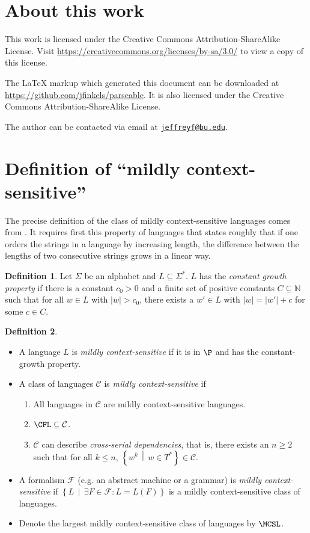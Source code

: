 \documentclass{article}
\theoremstyle{remark} \newtheorem{technicality}{Technical note}
\theoremstyle{definition} \newtheorem{definition}{Definition}
\newcommand{\email}[1]{\href{mailto:#1}{\nolinkurl{#1}}} %
\newcommand{\lb}{\left\{} %
\newcommand{\rb}{\right\}} %
\newcommand{\st}{\,\middle|\,} %
\begin{document}
\section{About this work}

This work is licensed under the Creative Commons Attribution-ShareAlike License.
Visit \mbox{\url{https://creativecommons.org/licenses/by-sa/3.0/}} to view a copy of this license.

The \LaTeX{} markup which generated this document can be downloaded at \mbox{\url{https://github.com/jfinkels/parseable}}.
It is also licensed under the Creative Commons Attribution-ShareAlike License.

The author can be contacted via email at \email{jeffreyf@bu.edu}.




\appendix
\section{Definition of ``mildly context-sensitive''}
\label{app:definitions}

The precise definition of the class of mildly context-sensitive languages comes from \cite{kallmeyer}.
It requires first this property of languages that states roughly that if one orders the strings in a language by increasing length, the difference between the lengths of two consecutive strings grows in a linear way.
\begin{definition}
  Let $\Sigma$ be an alphabet and $L\subseteq\Sigma^*$.
  $L$ has the \emph{constant growth property} if there is a constant $c_0>0$ and a finite set of positive constants $C\subseteq\mathbb{N}$ such that for all $w\in L$ with $|w|>c_0$, there exists a $w'\in L$ with $|w|=|w'|+c$ for some $c\in C$.
\end{definition}
\begin{definition}\mbox{}
  \begin{itemize}
  \item A language $L$ is \emph{mildly context-sensitive} if it is in $\P$ and has the constant-growth property.
  \item A class of languages $\mathcal{C}$ is \emph{mildly context-sensitive} if
    \begin{enumerate}
    \item All languages in $\mathcal{C}$ are mildly context-sensitive languages.
    \item $\CFL\subseteq\mathcal{C}$.
    \item $\mathcal{C}$ can describe \emph{cross-serial dependencies}, that is, there exists an $n\geq 2$ such that for all $k\leq n$, $\lb w^k \st w\in T^*\rb\in\mathcal{C}$.
    \end{enumerate}
  \item A formalism $\mathcal{F}$ (e.g. an abstract machine or a grammar) is \emph{mildly context-sensitive} if $\lb L \st \exists F\in\mathcal{F}\colon L = L(F)\rb$ is a mildly context-sensitive class of languages.
  \item Denote the largest mildly context-sensitive class of languages by $\MCSL$.
  \end{itemize}
\end{definition}
\end{document}
